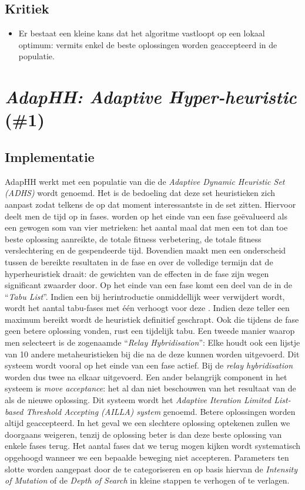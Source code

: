 \subsection{Kritiek}
\begin{itemize}
 \item Er bestaat een kleine kans dat het algoritme vastloopt op een lokaal optimum: vermits enkel de beste oplossingen worden geaccepteerd in de populatie.
\end{itemize}
\section{\emph{AdapHH: Adaptive Hyper-heuristic} (\#1)}
\label{sss:adaphh}
\subsection{Implementatie}
AdapHH\cite{chesc-adaphh,chesc-adaphh2,348072} werkt met een populatie van \abhn{} die de \emph{Adaptive Dynamic Heuristic Set (ADHS)} wordt genoemd. Het is de bedoeling dat deze set heuristieken zich aanpast zodat telkens de op dat moment interessantste \abhn{} in de set zitten. Hiervoor deelt men de tijd op in fases. \abh[H]{} worden op het einde van een fase ge\"evalueerd als een gewogen som van vier metrieken: het aantal maal dat men een tot dan toe beste oplossing aanreikte, de totale fitness verbetering, de totale fitness verslechtering en de gespendeerde tijd. Bovendien maakt men een onderscheid tussen de bereikte resultaten in de fase en over de volledige termijn dat de hyperheuristiek draait: de gewichten van de effecten in de fase zijn wegen significant zwaarder door. Op het einde van een fase komt een deel van de \abhn{} in de ``\emph{Tabu List}''\cite{DBLP:journals/informs/Glover89}. Indien een \abh{} bij herintroductie onmiddellijk weer verwijdert wordt, wordt het aantal tabu-fases met \'e\'en verhoogt voor deze \abh{}. Indien deze teller een maximum bereikt wordt de heuristiek definitief geschrapt. Ook \abhn{} die tijdens de fase geen betere oplossing vonden, rust een tijdelijk tabu. Een tweede manier waarop men \abhn{} selecteert is de zogenaamde ``\emph{Relay Hybridisation}'': Elke \abhn{} houdt ook een lijstje van 10 andere metaheuristieken bij die na de deze \abh{} kunnen worden uitgevoerd. Dit systeem wordt vooral op het einde van een fase actief. Bij de \emph{relay hybridisation} worden dus twee \abhn{} na elkaar uitgevoerd. Een ander belangrijk component in het systeem is \emph{move acceptance}: het al dan niet beschouwen van het resultaat van de \abh{} als de nieuwe oplossing. Dit systeem wordt het \emph{Adaptive Iteration Limited List-based Threshold Accepting (AILLA) system} genoemd. Betere oplossingen worden altijd geaccepteerd. In het geval we een slechtere oplossing optekenen zullen we doorgaans weigeren, tenzij de oplossing beter is dan deze beste oplossing van enkele fases terug. Het aantal fases dat we terug mogen kijken wordt systematisch opgehoogd wanneer we een bepaalde beweging niet accepteren. Parameters ten slotte worden aangepast door de \abhn{} te categoriseren en op basis hiervan de \emph{Intensity of Mutation} of de \emph{Depth of Search} in kleine stappen te verhogen of te verlagen.